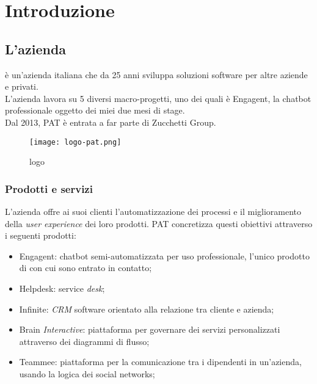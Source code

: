 
\chapter{Introduzione}
\label{cap:introduzione}
\section{L'azienda}

\company{} è un'azienda italiana che da 25 anni sviluppa soluzioni software per altre aziende e privati.\\
L'azienda lavora su 5 diversi macro-progetti, uno dei quali è Engagent, la chatbot professionale oggetto dei miei due mesi di stage.\\
Dal 2013, PAT è entrata a far parte di Zucchetti Group.
\begin{figure}[H]
    \centering
    \texttt{[image: logo-pat.png]} 
    \caption{logo \company{}}
    \label{logo:pat}
\end{figure}

\subsection{Prodotti e servizi}
L'azienda offre ai suoi clienti l'automatizzazione dei processi e il miglioramento della \textit{user experience} dei loro prodotti.
PAT concretizza questi obiettivi attraverso i seguenti prodotti:
\begin{itemize}
    \item Engagent: chatbot semi-automatizzata per uso professionale, l'unico prodotto di \company{} con cui sono entrato in contatto; 
    \item Helpdesk: service \emph{desk}\glsfirstoccur;
    \item Infinite: \textit{CRM} software orientato alla relazione tra cliente e azienda;
    \item Brain \textit{Interactive}: piattaforma per governare dei servizi personalizzati attraverso dei diagrammi di flusso; 
    \item Teammee: piattaforma per la comunicazione tra i dipendenti in un'azienda, usando la logica dei social networks;
\end{itemize}

